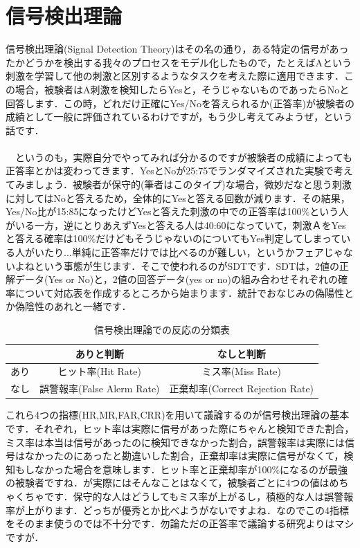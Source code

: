 \documentclass[11pt,a4paper,uplatex]{ujreport}
\begin{document}
\section{信号検出理論}
信号検出理論(Signal Detection Theory)はその名の通り，ある特定の信号があったかどうかを検出する我々のプロセスをモデル化したもので，たとえばAという刺激を学習して他の刺激と区別するようなタスクを考えた際に適用できます．この場合，被験者はA刺激を検知したらYesと，そうじゃないものであったらNoと回答します．この時，どれだけ正確にYes/Noを答えられるか(正答率)が被験者の成績として一般に評価されているわけですが，もう少し考えてみようぜ，という話です．\\
\\
　というのも，実際自分でやってみれば分かるのですが被験者の成績によっても正答率とかは変わってきます．YesとNoが25:75でランダマイズされた実験で考えてみましょう．被験者が保守的(筆者はこのタイプ)な場合，微妙だなと思う刺激に対してはNoと答えるため，全体的にYesと答える回数が減ります．その結果，Yes/No比が15:85になったけどYesと答えた刺激の中での正答率は100\%という人がいる一方，逆にとりあえずYesと答える人は40:60になっていて，刺激ＡをYesと答える確率は100\%だけどもそうじゃないのについてもYes判定してしまっている人がいたり...単純に正答率だけでは比べるのが難しい，というかフェアじゃないよねという事態が生じます．そこで使われるのがSDTです．SDTは，2値の正解データ(Yes or No)と，2値の回答データ(yes or no)の組み合わせそれぞれの確率について対応表を作成するところから始まります．統計でおなじみの偽陽性とか偽陰性のあれと一緒です．

\begin{table}[H]
  \centering
    \caption{信号検出理論での反応の分類表}
    \begin{tabular}{|l||c|c|}  \hline
       & ありと判断 & なしと判断 \\ \hline \hline
      あり & ヒット率(Hit Rate) & ミス率(Miss Rate)  \\ \hline
      なし & 誤警報率(False Alerm Rate) & 正棄却率(Correct Rejection Rate)  \\ \hline
    \end{tabular}
  \end{table}

これら4つの指標(HR,MR,FAR,CRR)を用いて議論するのが信号検出理論の基本です．それぞれ，ヒット率は実際に信号があった際にちゃんと検知できた割合，ミス率は本当は信号があったのに検知できなかった割合，誤警報率は実際には信号はなかったのにあったと勘違いした割合，正棄却率は実際に信号がなくて，検知もしなかった場合を意味します．ヒット率と正棄却率が100\%になるのが最強の被験者ですね．が実際にはそんなことはなくて，被験者ごとに4つの値はめちゃくちゃです．保守的な人はどうしてもミス率が上がるし，積極的な人は誤警報率が上がります．どっちが優秀とか比べようがないですよね．なのでこの4指標をそのまま使うのでは不十分です．勿論ただの正答率で議論する研究よりはマシですが．\\
\\
\end{document}
